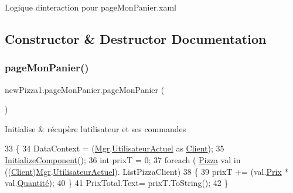 Logique d\textquotesingle{}interaction pour page\+Mon\+Panier.\+xaml 

\subsection{Constructor \& Destructor Documentation}
\mbox{\label{classnewPizza1_1_1pageMonPanier_ab752a6df6a2baf4cac209d7ded9b8cb9}} 
\subsubsection{\texorpdfstring{page\+Mon\+Panier()}{pageMonPanier()}}
{\footnotesize\ttfamily new\+Pizza1.\+page\+Mon\+Panier.\+page\+Mon\+Panier (\begin{DoxyParamCaption}{ }\end{DoxyParamCaption})\hspace{0.3cm}{\ttfamily [inline]}}



Initialise \& récupère l\textquotesingle{}utilisateur et ses commandes 


\begin{DoxyCode}
33         \{
34             DataContext = (\hyperlink{classnewPizza1_1_1pageMonPanier_a65e53ed4bd6187ed6837b84fb1deddae}{Mgr}.\hyperlink{classModele_1_1Manager_aa00c4632bd15b247d6b6793a6797dc82}{UtilisateurActuel} as \hyperlink{classModele_1_1Client}{Client});
35             \hyperlink{classnewPizza1_1_1pageMonPanier_af3487726644a638a98b47b824460a5f9}{InitializeComponent}();
36             \textcolor{keywordtype}{int} prixT = 0;
37             \textcolor{keywordflow}{foreach} ( \hyperlink{classModele_1_1Pizza}{Pizza} val \textcolor{keywordflow}{in} ((\hyperlink{classModele_1_1Client}{Client})\hyperlink{classnewPizza1_1_1pageMonPanier_a65e53ed4bd6187ed6837b84fb1deddae}{Mgr}.\hyperlink{classModele_1_1Manager_aa00c4632bd15b247d6b6793a6797dc82}{UtilisateurActuel}).
      ListPizzaClient)
38             \{
39                 prixT += (val.\hyperlink{classModele_1_1Pizza_a8a8c0efc22d46be85489d220228733ca}{Prix} * val.\hyperlink{classModele_1_1Pizza_ae755ca79feb6f9a522aa18544c3f1310}{Quantité});
40             \}
41             PrixTotal.Text= prixT.ToString();
42         \}
\end{DoxyCode}


